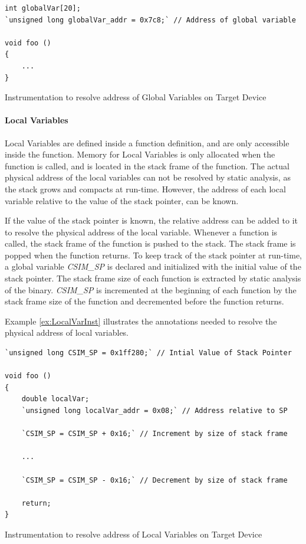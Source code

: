 \vspace*{15pt}
\begin{Example}
\begin{lstlisting}
int globalVar[20];
`unsigned long globalVar_addr = 0x7c8;` // Address of global variable

void foo ()
{
    ...
}
\end{lstlisting}
\caption{Instrumentation to resolve address of Global Variables on Target Device}
\label{ex:GlobVarInst}
\end{Example}

\paragraph{Local Variables}
Local Variables are defined inside a function definition, and are only accessible inside the function. Memory for Local Variables is only allocated when the function is called, and is located in the stack frame of the function. The actual physical address of the local variables can not be resolved by static analysis, as the stack grows and compacts at run-time. However, the address of each local variable relative to the value of the stack pointer, can be known.

If the value of the stack pointer is known, the relative address can be added to it to resolve the physical address of the local variable. Whenever a function is called, the stack frame of the function is pushed to the stack. The stack frame is popped when the function returns. To keep track of the stack pointer at run-time, a global variable \emph{CSIM\_SP} is declared and initialized with the initial value of the stack pointer. The stack frame size of each function is extracted by static analysis of the binary. \emph{CSIM\_SP} is incremented at the beginning of each function by the stack frame size of the function and decremented before the function returns.

Example \ref{ex:LocalVarInst} illustrates the annotations needed to resolve the physical address of local variables.

\begin{Example}
\begin{lstlisting}[label=lst:LocalVarInst]
`unsigned long CSIM_SP = 0x1ff280;` // Intial Value of Stack Pointer

void foo ()
{
    double localVar;
    `unsigned long localVar_addr = 0x08;` // Address relative to SP

    `CSIM_SP = CSIM_SP + 0x16;` // Increment by size of stack frame
    
    ...
    
    `CSIM_SP = CSIM_SP - 0x16;` // Decrement by size of stack frame
    
    return;
}
\end{lstlisting}
\caption{Instrumentation to resolve address of Local Variables on Target Device}
\label{ex:LocalVarInst}
\end{Example}

